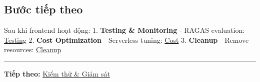 \hypertarget{bux1b0ux1edbc-tiux1ebfp-theo}{%
\subsection{Bước tiếp theo}}

Sau khi frontend hoạt động: 1. \textbf{Testing \& Monitoring} - RAGAS
evaluation: \href{5.15-Testing/}{Testing} 2. \textbf{Cost Optimization}
- Serverless tuning: \href{5.16-Cost/}{Cost} 3. \textbf{Cleanup} -
Remove resources: \href{5.17-Cleanup/}{Cleanup}

\begin{center}\rule{0.5\linewidth}{0.5pt}\end{center}

\textbf{Tiếp theo:} \href{5.15-Testing/}{Kiểm thử \& Giám sát}

